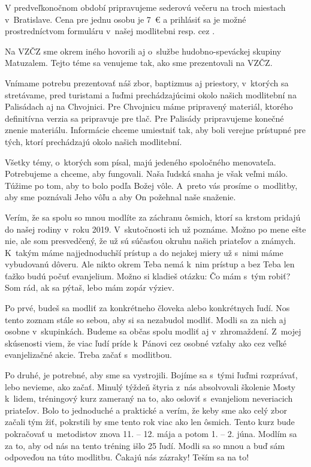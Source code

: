 V predveľkonočnom období pripravujeme sederovú večeru na troch miestach v~Bratislave. Cena pre jednu osobu je 7~€ a prihlásiť sa je možné prostredníctvom formuláru v~našej modlitebni resp. cez .

Na VZČZ sme okrem iného hovorili aj o~službe hudobno-speváckej skupiny Matuzalem. Tejto téme sa venujeme tak, ako sme prezentovali na VZČZ.

Vnímame potrebu prezentovať náš zbor, baptizmus aj priestory, v~ktorých sa stretávame, pred turistami a ľuďmi prechádzajúcimi okolo našich modlitební na Palisádach aj na Chvojnici. Pre Chvojnicu máme pripravený materiál, ktorého definitívna verzia sa pripravuje pre tlač. Pre Palisády pripravujeme konečné znenie materiálu. Informácie chceme umiestniť tak, aby boli verejne prístupné pre tých, ktorí prechádzajú okolo našich modlitební.

Všetky témy, o~ktorých som písal, majú jedeného spoločného menovateľa. Potrebujeme a chceme, aby fungovali. Naša ľudská snaha je však veľmi málo. Túžime po tom, aby to bolo podľa Božej vôle. A~preto vás prosíme o~modlitby, aby sme poznávali Jeho vôľu a aby On požehnal naše snaženie.



Verím, že sa spolu so mnou modlíte za záchranu ôsmich, ktorí sa krstom pridajú do našej rodiny v~roku 2019. V~skutočnosti ich už poznáme. Možno po mene ešte nie, ale som presvedčený, že už sú súčasťou okruhu našich priateľov a známych. K~takým máme najjednoduchší prístup a do nejakej miery už s~nimi máme vybudovanú dôveru. Ale nikto okrem Teba nemá k~nim prístup a bez Teba len ťažko budú počuť evanjelium. Možno si kladieš otázku: Čo mám s~tým robiť? Som rád, ak sa pýtaš, lebo mám zopár výziev.

Po prvé, budeš sa modliť za konkrétneho človeka alebo konkrétnych ľudí. Nos tento zoznam stále so sebou, aby si sa nezabudol modliť. Modli sa za nich aj osobne v~skupinkách. Budeme sa občas spolu modliť aj v~zhromaždení. Z~mojej skúsenosti viem, že viac ľudí príde k~Pánovi cez osobné vzťahy ako cez veľké evanjelizačné akcie. Treba začať s~modlitbou.

Po druhé, je potrebné, aby sme sa vystrojili. Bojíme sa s~tými ľuďmi rozprávať, lebo nevieme, ako začať. Minulý týždeň štyria z~nás absolvovali školenie {\bi Mosty k~lidem}, tréningový kurz zameraný na to, ako osloviť s~evanjeliom neveriacich priateľov. Bolo to jednoduché a praktické a verím, že keby sme ako celý zbor začali tým žiť, pokrstili by sme tento rok viac ako len ôsmich. Tento kurz bude pokračovať u~metodistov znova 11. -- 12. mája a potom 1. -- 2. júna. Modlím sa za to, aby od nás na tento tréning išlo 25 ľudí. Modli sa so mnou a buď sám odpoveďou na túto modlitbu. Čakajú nás zázraky! Teším sa na to!

